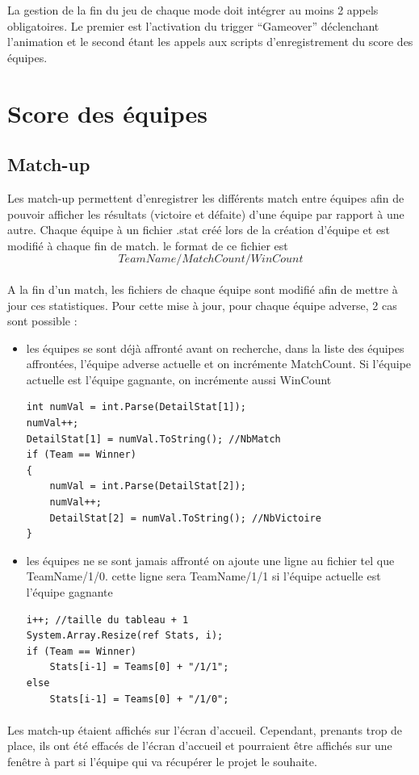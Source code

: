 \documentclass{report}
\begin{document}
La gestion de la fin du jeu de chaque mode doit intégrer au moins 2 appels obligatoires. Le premier est l’activation du trigger “Gameover” déclenchant l’animation et le second étant les appels aux scripts d’enregistrement du score des équipes.


\section{Score des équipes}

\subsection{Match-up}
Les match-up permettent d'enregistrer les différents match entre équipes afin de pouvoir afficher les résultats (victoire et défaite) d'une équipe par rapport à une autre. Chaque équipe à un fichier .stat créé lors de la création d'équipe et est modifié à chaque fin de match. le format de ce fichier est 
\[
TeamName/MatchCount/WinCount
\]
\paragraph{}
A la fin d'un match, les fichiers de chaque équipe sont modifié afin de mettre à jour ces statistiques. \newline
Pour cette mise à jour, pour chaque équipe adverse, 2 cas sont possible :
\newline
\begin{itemize}
\item
les équipes se sont déjà affronté avant
on recherche, dans la liste des équipes affrontées, l'équipe adverse actuelle et on incrémente MatchCount. Si l'équipe actuelle est l'équipe gagnante, on incrémente aussi WinCount
\begin{lstlisting}[frame=single]
int numVal = int.Parse(DetailStat[1]);
numVal++;
DetailStat[1] = numVal.ToString(); //NbMatch
if (Team == Winner)
{
    numVal = int.Parse(DetailStat[2]);
    numVal++;
    DetailStat[2] = numVal.ToString(); //NbVictoire
}
\end{lstlisting}
\item
les équipes ne se sont jamais affronté
on ajoute une ligne au fichier tel que TeamName/1/0. cette ligne sera TeamName/1/1 si l'équipe actuelle est l'équipe gagnante
\begin{lstlisting}[frame=single]
i++; //taille du tableau + 1
System.Array.Resize(ref Stats, i);
if (Team == Winner) 
    Stats[i-1] = Teams[0] + "/1/1";
else 
    Stats[i-1] = Teams[0] + "/1/0";
\end{lstlisting}
\paragraph{}
\end{itemize}
Les match-up étaient affichés sur l'écran d'accueil. Cependant, prenants trop de place, ils ont été effacés de l'écran d'accueil et pourraient être affichés sur une fenêtre à part si l’équipe qui va récupérer le projet le souhaite.
\end{document}
